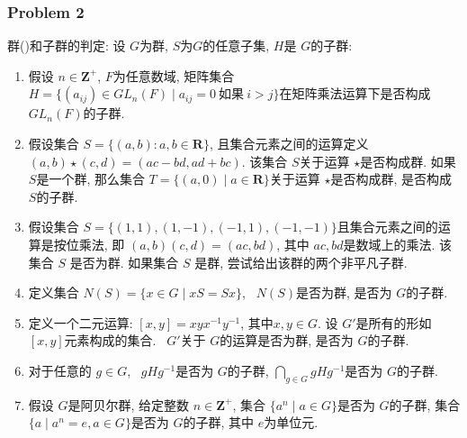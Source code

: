 \documentclass[a4paper,12pt]{ctexart}
\newcommand{\Z}{\mathbf{Z}}
\newcommand{\R}{\mathbf{R}}
\begin{document}
\subsubsection*{Problem 2}
    群()和子群的判定: 设 $ G $为群, $ S $为$ G $的任意子集, $ H $是 $ G $的子群:
    \begin{enumerate}
        \item 假设 $ n\in\Z^+ $, $ F $为任意数域, 矩阵集合 $ H=\{(a_{ij})\in GL_n(F)\mid a_{ij}=0~\text{如果}~i>j\} $在矩阵乘法运算下是否构成 $ GL_n(F) $的子群.
        \item 假设集合 $ S=\{(a,b):a,b\in\R\} $, 且集合元素之间的运算定义 $ (a,b)\star (c,d)=(ac-bd,ad+bc) $. 该集合 $ S $关于运算 $ \star $是否构成群. 
        如果 $ S $是一个群, 那么集合 $ T=\{(a,0)\mid a\in\R\} $关于运算 $ \star $是否构成群, 是否构成 $ S $的子群.
        
        \item 假设集合 $ S=\{(1,1),(1,-1),(-1,1),(-1,-1)\} $且集合元素之间的运算是按位乘法, 即 $ (a,b)(c,d)=(ac,bd) $, 其中 $ ac,bd $是数域上的乘法. 该集合 $ S $ 是否为群. 
        如果集合 $ S $ 是群, 尝试给出该群的两个非平凡子群.
        \item 定义集合 $ N(S) = \{x\in G \mid xS = Sx\} $, ~$ N(S) $是否为群, 是否为 $ G $的子群.
        \item 定义一个二元运算: $ \left[x,y\right]=xyx^{-1}y^{-1} $, 其中$ x,y\in G $. 设 $ G' $是所有的形如 $ \left[x,y\right] $元素构成的集合.
         ~$ G' $关于 $ G $的运算是否为群, 是否为 $ G $的子群.
        \item 对于任意的 $ g\in G $,  ~$ gHg^{-1} $是否为 $ G $的子群, $ \bigcap_{g\in G}gHg^{-1} $是否为 $ G $的子群.
        \item 假设 $ G $是阿贝尔群, 给定整数 $ n\in\Z^+ $, 集合 $ \{a^n\mid a\in G\} $是否为 $ G $的子群, 集合 $ \{a\mid a^n=e,a\in G\} $是否为 $ G $的子群, 其中 $ e $为单位元.
    \end{enumerate}
\end{document}
